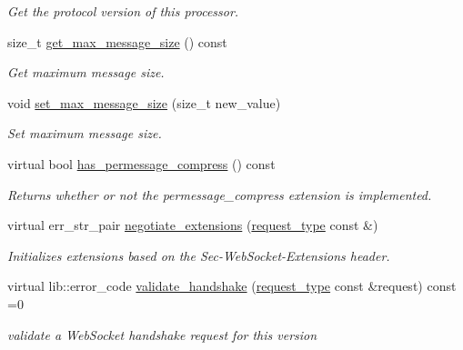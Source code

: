 \begin{DoxyCompactItemize}
\begin{DoxyCompactList}\small\item\em Get the protocol version of this processor. \end{DoxyCompactList}\item 
size\+\_\+t \hyperlink{classwebsocketpp_1_1processor_1_1processor_ade6eea6e4c97065030ed9106613d47f9}{get\+\_\+max\+\_\+message\+\_\+size} () const
\begin{DoxyCompactList}\small\item\em Get maximum message size. \end{DoxyCompactList}\item 
void \hyperlink{classwebsocketpp_1_1processor_1_1processor_ad412d33b168539dfbfa1d7e89908c5d1}{set\+\_\+max\+\_\+message\+\_\+size} (size\+\_\+t new\+\_\+value)
\begin{DoxyCompactList}\small\item\em Set maximum message size. \end{DoxyCompactList}\item 
virtual bool \hyperlink{classwebsocketpp_1_1processor_1_1processor_aadfe0d42b76757aba603d9cc06c9ffd1}{has\+\_\+permessage\+\_\+compress} () const
\begin{DoxyCompactList}\small\item\em Returns whether or not the permessage\+\_\+compress extension is implemented. \end{DoxyCompactList}\item 
virtual err\+\_\+str\+\_\+pair \hyperlink{classwebsocketpp_1_1processor_1_1processor_aad69873505ba59f4ddf53e864f32bb80}{negotiate\+\_\+extensions} (\hyperlink{classwebsocketpp_1_1http_1_1parser_1_1request}{request\+\_\+type} const \&)
\begin{DoxyCompactList}\small\item\em Initializes extensions based on the Sec-\/\+Web\+Socket-\/\+Extensions header. \end{DoxyCompactList}\item 
virtual lib\+::error\+\_\+code \hyperlink{classwebsocketpp_1_1processor_1_1processor_a8828f7d91c534309deb966b783eb1f8e}{validate\+\_\+handshake} (\hyperlink{classwebsocketpp_1_1http_1_1parser_1_1request}{request\+\_\+type} const \&request) const =0
\begin{DoxyCompactList}\small\item\em validate a Web\+Socket handshake request for this version \end{DoxyCompactList}\item 

\end{DoxyCompactItemize}
